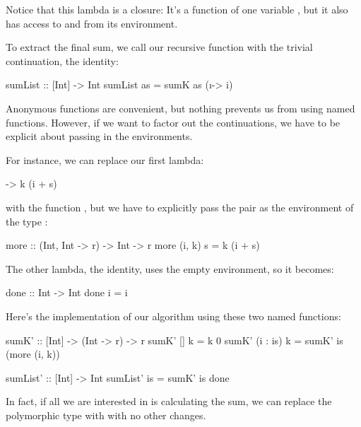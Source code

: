 \documentclass[DaoFP]{subfiles}
\begin{document}
Notice that this lambda is a closure: It's a function of one variable , but it also has access to  and  from its environment.

To extract the final sum, we call our recursive function with the trivial continuation, the identity:
\begin{haskell}
sumList :: [Int] -> Int
sumList as = sumK as (\i -> i)
\end{haskell}

Anonymous functions are convenient, but nothing prevents us from using named functions. However, if we want to factor out the continuations, we have to be explicit about passing in the environments. 

For instance, we can replace our first lambda:
\begin{haskell}
\s -> k (i + s)
\end{haskell}
with the function , but we have to explicitly pass the pair  as the environment of the type :
\begin{haskell}
more :: (Int, Int -> r) -> Int -> r
more (i, k) s = k (i + s)
\end{haskell}
The other lambda, the identity, uses the empty environment, so it becomes:
\begin{haskell}
done :: Int -> Int
done i = i
\end{haskell}
Here's the implementation of our algorithm using these two named functions:
\begin{haskell}
sumK' :: [Int] -> (Int -> r) -> r
sumK' [] k = k 0
sumK' (i : is) k =
  sumK' is (more (i, k))
\end{haskell}

\begin{haskell}
sumList' :: [Int] -> Int
sumList' is = sumK' is done
\end{haskell}

In fact, if all we are interested in is calculating the sum, we can replace the polymorphic type  with  with no other changes.
\end{document}
